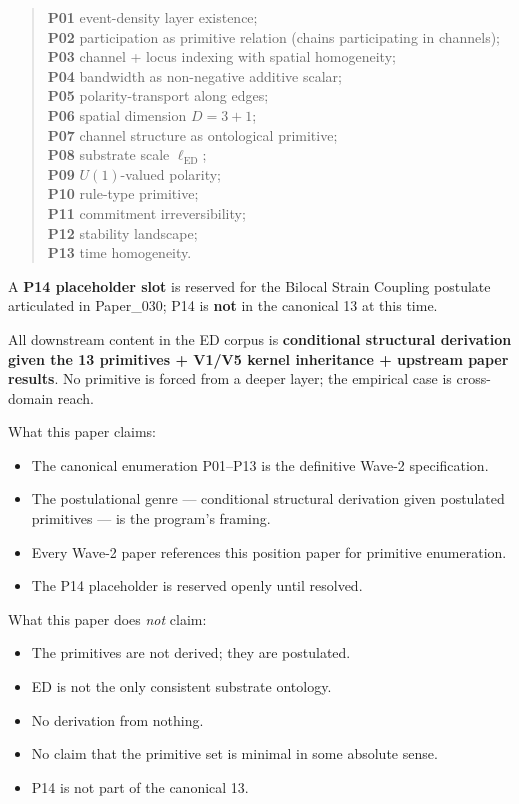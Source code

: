 \documentclass[11pt,a4paper]{article}
\begin{document}
\begin{quote}
\textbf{P01} event-density layer existence;\\
\textbf{P02} participation as primitive relation (chains participating in channels);\\
\textbf{P03} channel + locus indexing with spatial homogeneity;\\
\textbf{P04} bandwidth as non-negative additive scalar;\\
\textbf{P05} polarity-transport along edges;\\
\textbf{P06} spatial dimension $D = 3+1$;\\
\textbf{P07} channel structure as ontological primitive;\\
\textbf{P08} substrate scale $\ell_\mathrm{ED}$;\\
\textbf{P09} $U(1)$-valued polarity;\\
\textbf{P10} rule-type primitive;\\
\textbf{P11} commitment irreversibility;\\
\textbf{P12} stability landscape;\\
\textbf{P13} time homogeneity.
\end{quote}

A \textbf{P14 placeholder slot} is reserved for the Bilocal Strain Coupling postulate articulated in Paper\_030; P14 is \textbf{not} in the canonical 13 at this time.

All downstream content in the ED corpus is \textbf{conditional structural derivation given the 13 primitives + V1/V5 kernel inheritance + upstream paper results}. No primitive is forced from a deeper layer; the empirical case is cross-domain reach.

What this paper claims:

\begin{itemize}[noitemsep]
\item The canonical enumeration P01--P13 is the definitive Wave-2 specification.
\item The postulational genre --- conditional structural derivation given postulated primitives --- is the program's framing.
\item Every Wave-2 paper references this position paper for primitive enumeration.
\item The P14 placeholder is reserved openly until resolved.
\end{itemize}

What this paper does \emph{not} claim:

\begin{itemize}[noitemsep]
\item The primitives are not derived; they are postulated.
\item ED is not the only consistent substrate ontology.
\item No derivation from nothing.
\item No claim that the primitive set is minimal in some absolute sense.
\item P14 is not part of the canonical 13.
\end{itemize}
\end{document}
